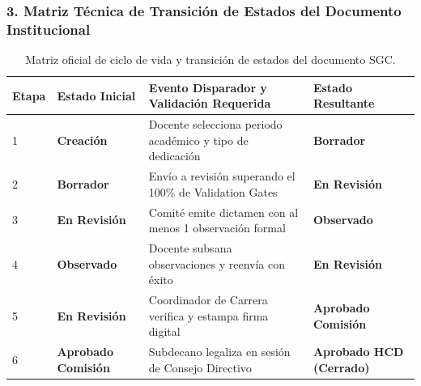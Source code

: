 \documentclass[12pt,a4paper]{article}
\begin{document}
\subsubsection*{3. Matriz Técnica de Transición de Estados del Documento Institucional}
\begin{table}[H]
\centering
\small
\renewcommand{\arraystretch}{1.2}
\begin{tabularx}{\textwidth}{|>{\hsize=0.45\hsize\centering\arraybackslash\footnotesize}X|>{\hsize=0.95\hsize\raggedright\arraybackslash\bfseries\footnotesize}X|>{\hsize=1.6\hsize\raggedright\arraybackslash\footnotesize}X|>{\hsize=1.0\hsize\raggedright\arraybackslash\footnotesize}X|}
\hline
\rowcolor{tableheader}
\textbf{Etapa} & \textbf{Estado Inicial} & \textbf{Evento Disparador y Validación Requerida} & \textbf{Estado Resultante} \\
\hline
1 & Creación & Docente selecciona periodo académico y tipo de dedicación & \textbf{Borrador} \\
\hline
2 & Borrador & Envío a revisión superando el 100\% de Validation Gates & \textbf{En Revisión} \\
\hline
3 & En Revisión & Comité emite dictamen con al menos 1 observación formal & \textbf{Observado} \\
\hline
4 & Observado & Docente subsana observaciones y reenvía con éxito & \textbf{En Revisión} \\
\hline
5 & En Revisión & Coordinador de Carrera verifica y estampa firma digital & \textbf{Aprobado Comisión} \\
\hline
6 & Aprobado Comisión & Subdecano legaliza en sesión de Consejo Directivo & \textbf{Aprobado HCD (Cerrado)} \\
\hline
\end{tabularx}
\caption{Matriz oficial de ciclo de vida y transición de estados del documento SGC.}
\end{table}
\end{document}
